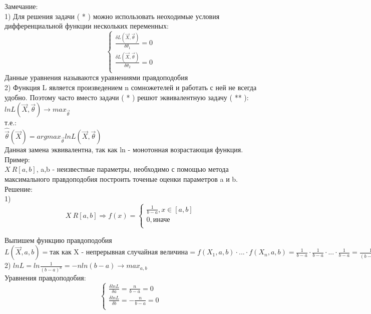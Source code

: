 Замечание:\\
1) Для решения задачи ( * ) можно использовать неоходимые условия дифференциальной функции нескольких переменных:\\
\begin{equation}
\begin{cases}
\frac{\delta L(\overrightarrow{X}, \overrightarrow{\theta})}{\delta \theta_{1}} = 0\\
\frac{\delta L(\overrightarrow{X}, \overrightarrow{\theta})}{\delta \theta_{2}} = 0\\
\end{cases}
\end{equation}
Данные уравнения называются уравнениями правдоподобия\\
2) Функция L является произведением n сомножетелей и работать с ней не всегда удобно. Поэтому часто вместо задачи ( * ) решют эквивалентную задачу ( ** ):\\
$ln L(\overrightarrow{X},\overrightarrow{\theta}) \rightarrow max_{\overrightarrow{\theta}}$\\
т.е.:\\
$\hat{\overrightarrow{\theta}}(\overrightarrow{X}) = arg max_{\overrightarrow{\theta}} ln L(\overrightarrow{X}, \overrightarrow{\theta})$\\
Данная замена эквивалентна, так как ln - монотонная возрастающая функция.\\	

Пример:\\
$X ~ R[a,b]$, a,b - неизвестные параметры, необходимо с помощью метода максимального правдоподобия построить точеные оценки параметров a и b.\\

Решение:\\
1)\\
\begin{equation}
X ~ R[a, b] \Rightarrow f(x) = 
\begin{cases}
\frac{1}{b - a}, x \in [a ,b]\\
0, \text{иначе}\\
\end{cases}
\end{equation}

Выпишем функцию правдоподобия $L(\overrightarrow{X}, a, b) = \text{так как X - непрерывная случайная величина} = f(X_{1}, a, b) \cdot ... \cdot f(X_{n}, a, b) = \frac{1}{b - a} \cdot \frac{1}{b - a} \cdot ... \cdot \frac{1}{b - a}  = \frac{1}{(b - a)^{n}}$\\
2) $ ln L = ln \frac{1}{(b - a)^{n}} = -n ln (b - a) \rightarrow max_{a,b}$\\
Уравнения правдоподобия:\\
\begin{equation}
\begin{cases}
\frac{\delta ln L}{\delta a} = \frac{n}{b - a} = 0\\
\frac{\delta ln L}{\delta b} = -\frac{n}{b - a} = 0\\
\end{cases}
\end{equation}

